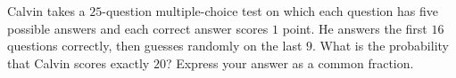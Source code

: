 Calvin takes a $25$-question multiple-choice test on which each question has five possible answers and each correct answer scores $1$ point. He answers the first $16$ questions correctly, then guesses randomly on the last $9$. What is the probability that Calvin scores exactly $20$? Express your answer as a common fraction.
